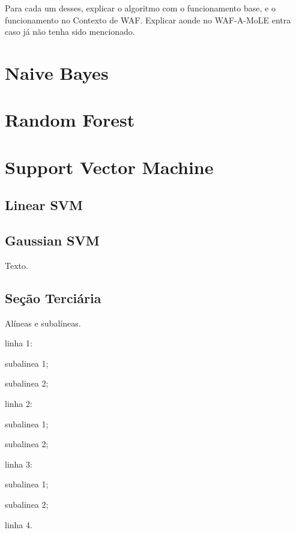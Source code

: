 Para cada um desses, explicar o algoritmo com o funcionamento base, e o funcionamento no Contexto de WAF. Explicar aonde no WAF-A-MoLE entra caso já não tenha sido mencionado. 

\section{Naive Bayes}

\section{Random Forest}

\section{Support Vector Machine}

\subsection{Linear SVM}

\subsection{Gaussian SVM}






Texto.

\subsection{Seção Terciária}

Alíneas e subalíneas.
\bigskip

\begin{alineas}
\item linha 1:
\begin{alineas}
\item subalinea 1;
\item subalinea 2;
\end{alineas}
\item linha 2:
\begin{subalineas}
\item subalinea 1;
\item subalinea 2;
\end{subalineas}
\item linha 3:
\begin{incisos}
\item subalinea 1;
\item subalinea 2;
\end{incisos}
\item linha 4.
\end{alineas}


